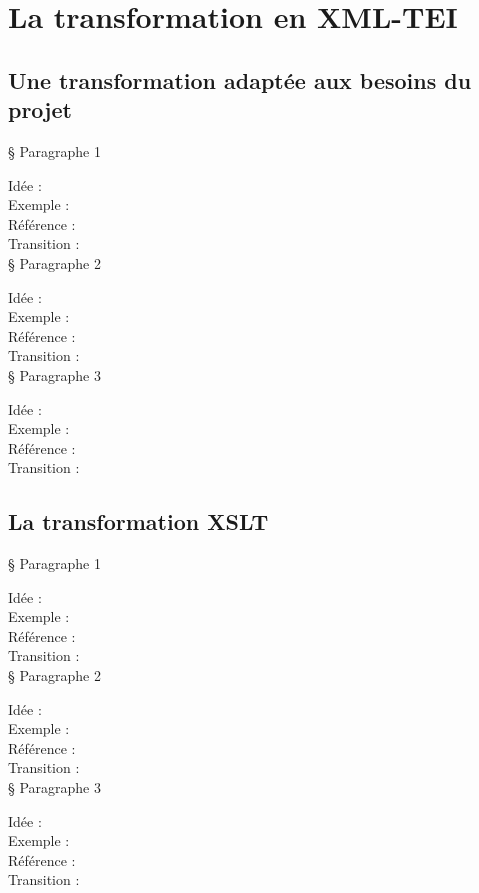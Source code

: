  \section{La transformation en XML-TEI}
    \subsection{Une transformation adaptée aux besoins du projet}

§ Paragraphe 1

Idée :\\
Exemple :\\
Référence :\\
Transition :\\

§ Paragraphe 2

Idée :\\
Exemple :\\
Référence :\\
Transition :\\

§ Paragraphe 3

Idée :\\
Exemple :\\
Référence :\\
Transition :\\

\subsection{La transformation XSLT}

§ Paragraphe 1

Idée :\\
Exemple :\\
Référence :\\
Transition :\\

§ Paragraphe 2

Idée :\\
Exemple :\\
Référence :\\
Transition :\\

§ Paragraphe 3

Idée :\\
Exemple :\\
Référence :\\
Transition :\\
